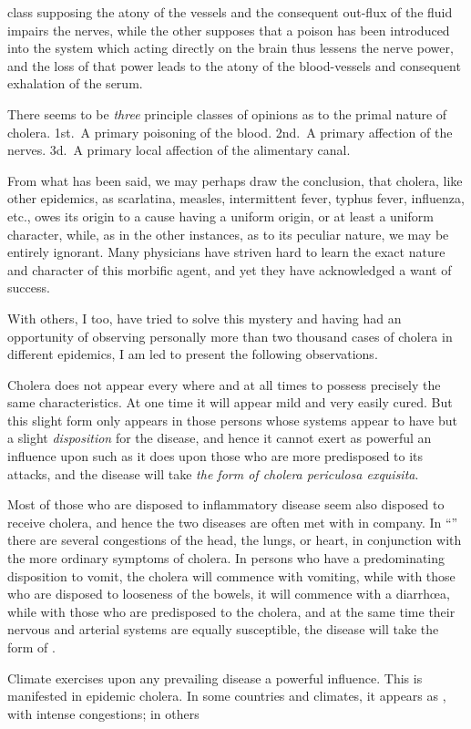 class supposing the atony of the vessels and the consequent out-flux
of the fluid impairs the nerves, while the other supposes that a poison
has been introduced into the system which acting directly on the brain
thus lessens the nerve power, and the loss of that power leads to the
atony of the blood-vessels and consequent exhalation of the serum.

There seems to be \emph{three} principle classes of opinions as to the primal
nature of cholera. 1st.\ A primary poisoning of the blood. 2nd.\ A
primary affection of the nerves. 3d.\ A primary local affection of the
alimentary canal.

From what has been said, we may perhaps draw the conclusion, that
cholera, like other epidemics, as scarlatina, measles, intermittent fever,
typhus fever, influenza, etc., owes its origin to a cause having a uniform
origin, or at least a uniform character, while, as in the other instances,
as to its peculiar nature, we may be entirely ignorant. Many physicians
have striven hard to learn the exact nature and character of this morbific
agent, and yet they have acknowledged a want of success.

With others, I too, have tried to solve this mystery and having had
an opportunity of observing personally more than two thousand cases
of cholera in different epidemics, I am led to present the following observations.

Cholera does not appear every where and at all times to possess precisely
the same characteristics. At one time it will appear mild and
very easily cured. But this slight form only appears in those persons
whose systems appear to have but a slight \emph{disposition} for the disease,
and hence it cannot exert as powerful an influence upon such as it does
upon those who are more predisposed to its attacks, and the disease will
take \emph{the form of cholera periculosa exquisita}.

Most of those who are disposed to inflammatory disease seem also
disposed to receive cholera, and hence the two diseases are often met
with in company. In ``'' there are several congestions
of the head, the lungs, or heart, in conjunction with the more ordinary
symptoms of cholera. In persons who have a predominating disposition
to vomit, the cholera will commence with vomiting, while with
those who are disposed to looseness of the bowels, it will commence
with a diarrhœa, while with those who are predisposed to the cholera,
and at the same time their nervous and arterial systems are equally
susceptible, the disease will take the form of .

Climate exercises upon any prevailing disease a powerful influence.
This is manifested in epidemic cholera. In some countries and climates,
it appears as , with intense congestions; in others\endinput